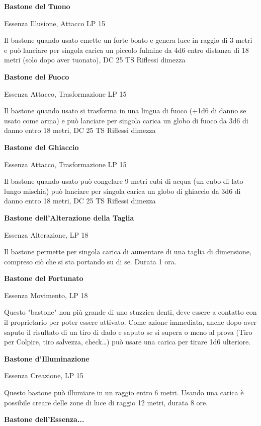 \documentclass[a4paper,11pt,twoside,openany]{book}
\begin{document}
\textbf{Bastone del Tuono}

Essenza Illusione, Attacco LP 15

Il bastone quando usato emette un forte boato e genera luce in raggio di 3 metri e può lanciare per singola carica un piccolo fulmine da 4d6 entro distanza di 18 metri (solo dopo aver tuonato), DC 25 TS Riflessi dimezza

\textbf{Bastone del Fuoco}

Essenza Attacco, Trasformazione LP 15

Il bastone quando usato si trasforma in una lingua di fuoco (+1d6 di danno se usato come arma) e può lanciare per singola carica un globo di fuoco da 3d6 di danno entro 18 metri, DC 25 TS Riflessi dimezza

\textbf{Bastone del Ghiaccio}

Essenza Attacco, Trasformazione LP 15

Il bastone quando usato può congelare 9 metri cubi di acqua (un cubo di lato lungo mischia) può lanciare per singola carica un globo di ghiaccio da 3d6 di danno entro 18 metri, DC 25 TS Riflessi dimezza

\textbf{Bastone dell'Alterazione della Taglia}

Essenza Alterazione, LP 18

Il bastone permette per singola carica di aumentare di una taglia di dimensione, compreso ciò che si sta portando su di se. Durata 1 ora.

\textbf{Bastone del Fortunato}

Essenza Movimento, LP 18

Questo "bastone" non più grande di uno stuzzica denti, deve essere a contatto con il proprietario per poter essere attivato. Come azione immediata, anche dopo aver saputo il risultato di un tiro di dado e saputo se si supera o meno al prova (Tiro per Colpire, tiro salvezza, check\ldots ) può usare una carica per tirare 1d6 ulteriore.

\textbf{Bastone d'Illuminazione}

Essenza Creazione, LP 15

Questo bastone può illumiare in un raggio entro 6 metri. Usando una carica è possibile creare delle zone di luce di raggio 12 metri, durata 8 ore.

\textbf{Bastone dell'Essenza...}
\end{document}
